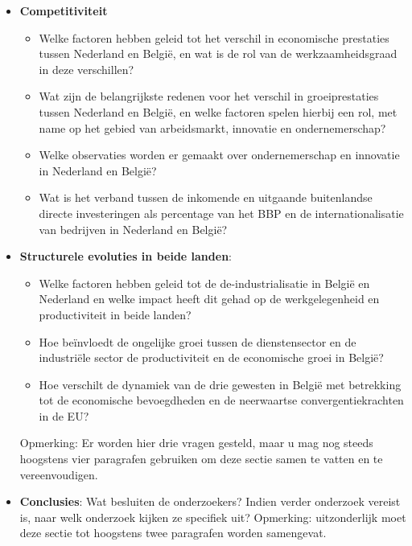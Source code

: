 \begin{itemize}
	\item \textbf{Competitiviteit}
	\begin{itemize}
		\item Welke factoren hebben geleid tot het verschil in economische prestaties tussen Nederland en België, en wat is de rol van de werkzaamheidsgraad in deze verschillen?
		\item Wat zijn de belangrijkste redenen voor het verschil in groeiprestaties tussen Nederland en België, en welke factoren spelen hierbij een rol, met name op het gebied van arbeidsmarkt, innovatie en ondernemerschap?
		\item Welke observaties worden er gemaakt over ondernemerschap en innovatie in Nederland en België?
		\item Wat is het verband tussen de inkomende en uitgaande buitenlandse directe investeringen als percentage van het BBP en de internationalisatie van bedrijven in Nederland en België?
	\end{itemize}
	\item \textbf{Structurele evoluties in beide landen}:
	\begin{itemize}
		\item Welke factoren hebben geleid tot de de-industrialisatie in België en Nederland en welke impact heeft dit gehad op de werkgelegenheid en productiviteit in beide landen?
		\item Hoe beïnvloedt de ongelijke groei tussen de dienstensector en de industriële sector de productiviteit en de economische groei in België?
		\item Hoe verschilt de dynamiek van de drie gewesten in België met betrekking tot de economische bevoegdheden en de neerwaartse convergentiekrachten in de EU?
	\end{itemize}
	Opmerking: Er worden hier drie vragen gesteld, maar u mag nog steeds hoogstens vier paragrafen gebruiken om deze sectie samen te vatten en te vereenvoudigen.
	\item \textbf{Conclusies}: Wat besluiten de onderzoekers?  Indien verder onderzoek vereist is, naar welk onderzoek kijken ze specifiek uit? Opmerking: uitzonderlijk moet deze sectie tot hoogstens twee paragrafen worden samengevat.
\end{itemize} 
